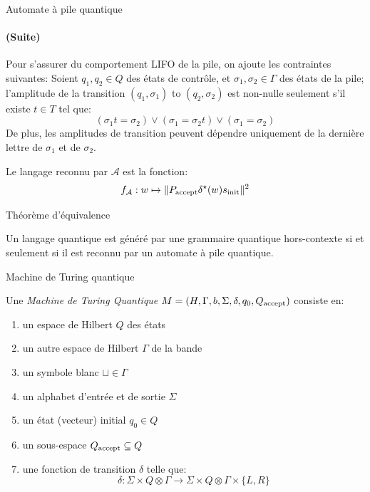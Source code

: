 \documentclass[aspectratio=169]{beamer}
\theoremstyle{plain}
\theoremstyle{definition}
\begin{document}
\begin{frame}{Automate à pile quantique}
    \framesubtitle{(Suite)}
    Pour s'assurer du comportement LIFO de la pile, on ajoute les contraintes suivantes:
    Soient $q_1, q_2\in Q$ des états de contrôle, et $\sigma_1, \sigma_2\in \Gamma$ des états de la pile; l'amplitude de la transition $(q_1, \sigma_1)$ to $(q_2, \sigma_2)$ est non-nulle seulement s'il existe $t\in T$ tel que:
    \begin{equation*}
        (\sigma_1t = \sigma_2) \lor (\sigma_1 = \sigma_2t) \lor (\sigma_1 = \sigma_2)
    \end{equation*}
    De plus, les amplitudes de transition peuvent dépendre uniquement de la dernière lettre de $\sigma_1$ et de $\sigma_2$.

    Le langage reconnu par $\mathcal{A}$ est la fonction:
    \begin{equation*}
        f_{\mathcal{A}} : w \mapsto \|P_{\textnormal{accept}}\delta^\star(w)s_{\textnormal{init}}\|^2
    \end{equation*}
\end{frame}

\begin{frame}{Théorème d'équivalence}
    \begin{theorem}
        Un langage quantique est généré par une grammaire quantique hors-contexte si et seulement si il est reconnu par un automate à pile quantique.
    \end{theorem}
\end{frame}

\begin{frame}{Machine de Turing quantique}
    \begin{definition}[MTQ] Une \emph{Machine de Turing Quantique} $M = (H, \Gamma, b, \Sigma, \delta, q_0, Q_{\textnormal{accept}})$ consiste en:
        \begin{enumerate}[label=--, noitemsep]
            \item un espace de Hilbert $Q$ des états
            \item un autre espace de Hilbert $\Gamma$ de la bande
            \item un symbole blanc $\sqcup\in \Gamma$
            \item un alphabet d'entrée et de sortie $\Sigma$
            \item un état (vecteur) initial $q_0\in Q$
            \item un sous-espace $Q_{\textnormal{accept}}\subseteq Q$
            \item une fonction de transition $\delta$ telle que:
            \begin{equation*}
                \delta : \Sigma \times Q\otimes \Gamma \to \Sigma \times Q\otimes \Gamma \times \{L, R\}
            \end{equation*}
        \end{enumerate}
    \end{definition}
\end{frame}
\end{document}
